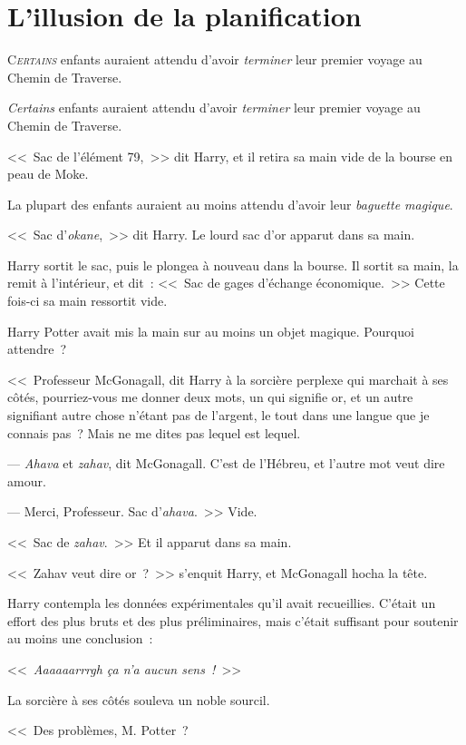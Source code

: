 \chapter{L'illusion de la planification}

\lettrine{C}{\emph{ertains}} enfants auraient attendu d'avoir \emph{terminer} leur premier voyage au Chemin de Traverse.

\emph{Certains} enfants auraient attendu d'avoir \emph{terminer} leur premier voyage au Chemin de Traverse.

<<~Sac de l'élément 79,~>> dit Harry, et il retira sa main vide de la bourse en peau de Moke.

La plupart des enfants auraient au moins attendu d'avoir leur \emph{baguette magique}.

<<~Sac d'\emph{okane},~>> dit Harry. Le lourd sac d'or apparut dans sa main.

Harry sortit le sac, puis le plongea à nouveau dans la bourse. Il sortit sa main, la remit à l'intérieur, et dit~: <<~Sac de gages d'échange économique.~>> Cette fois-ci sa main ressortit vide.

Harry Potter avait mis la main sur au moins un objet magique. Pourquoi attendre~?

<<~Professeur McGonagall, dit Harry à la sorcière perplexe qui marchait à ses côtés, pourriez-vous me donner deux mots, un qui signifie or, et un autre signifiant autre chose n'étant pas de l'argent, le tout dans une langue que je connais pas~? Mais ne me dites pas lequel est lequel.

--- \emph{Ahava} et \emph{zahav}, dit McGonagall. C'est de l'Hébreu, et l'autre mot veut dire amour.

--- Merci, Professeur. Sac d'\emph{ahava}.~>> Vide.

<<~Sac de \emph{zahav}.~>> Et il apparut dans sa main.

<<~Zahav veut dire or~?~>> s'enquit Harry, et McGonagall hocha la tête.

Harry contempla les données expérimentales qu'il avait recueillies. C'était un effort des plus bruts et des plus préliminaires, mais c'était suffisant pour soutenir au moins une conclusion~:

<<~\emph{Aaaaaarrrgh ça n'a aucun sens~!}~>>

La sorcière à ses côtés souleva un noble sourcil.

<<~Des problèmes, M. Potter~?

